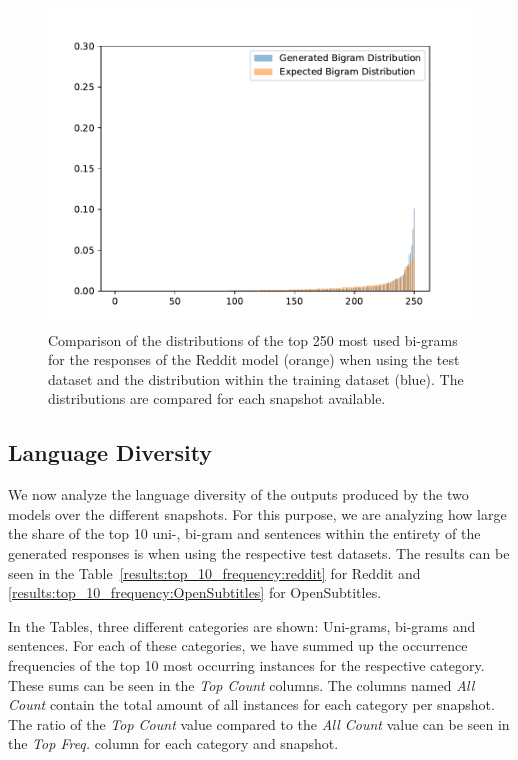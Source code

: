 \begin{figure}[H]
	\centering
	\small
	\endminipage\hfill
	\includegraphics[width=\linewidth]{img/plots/reddit/bigram_distribution_comparison_step_3000000.pdf}
	\centering
	\small
	\endminipage\hfill
	\caption{Comparison of the distributions of the top 250 most used bi-grams for the responses of the Reddit model (orange) when using the test dataset and the distribution within the training dataset (blue). The distributions are compared for each snapshot available.}
	\label{results:bigram:distributions:reddit}
\end{figure}

\subsection{Language Diversity}
We now analyze the language diversity of the outputs produced by the two models over the different snapshots.  For this purpose, we are analyzing how large the share of the top 10 uni-, bi-gram and sentences within the entirety of the generated responses is when using the respective test datasets. The results can be seen in the Table~\ref{results:top_10_frequency:reddit} for Reddit and \ref{results:top_10_frequency:OpenSubtitles} for OpenSubtitles. 

In the Tables, three different categories are shown: Uni-grams, bi-grams and sentences. For each of these categories, we have summed up the occurrence frequencies of the top 10 most occurring instances for the respective category. These sums can be seen in the \emph{Top Count} columns. The columns named \emph{All Count} contain the total amount of all instances for each category per snapshot. The ratio of the \emph{Top Count} value compared to the \emph{All Count} value can be seen in the \emph{Top Freq.} column for each category and snapshot.

